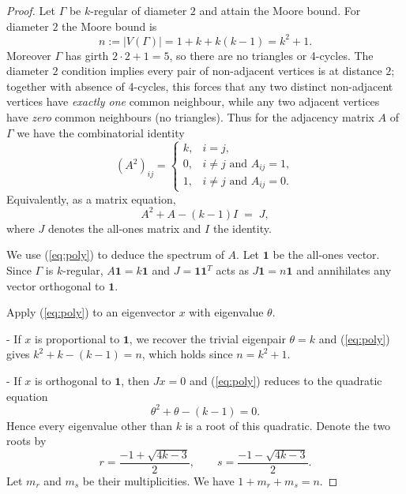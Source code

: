 \documentclass[12pt,a4paper,openany]{book}
\begin{document}
\begin{proof}
Let \(\Gamma\) be \(k\)-regular of diameter \(2\) and attain the Moore
bound. For diameter \(2\) the Moore bound is
\[
n := |V(\Gamma)| = 1 + k + k(k-1) = k^2 + 1.
\]
Moreover \(\Gamma\) has girth \(2\cdot 2 + 1 = 5\), so there are no
triangles or 4-cycles. The diameter \(2\) condition implies every pair
of non-adjacent vertices is at distance \(2\); together with absence of
4-cycles, this forces that any two distinct non-adjacent vertices have
\emph{exactly one} common neighbour, while any two adjacent vertices
have \emph{zero} common neighbours (no triangles). Thus for the adjacency
matrix \(A\) of \(\Gamma\) we have the combinatorial identity
\[
(A^2)_{ij} =
\begin{cases}
k, & i=j,\\[3pt]
0, & i\ne j \text{ and } A_{ij}=1,\\[3pt]
1, & i\ne j \text{ and } A_{ij}=0.
\end{cases}
\]
Equivalently, as a matrix equation,
\begin{equation}\label{eq:poly}
A^2 + A - (k-1)I \;=\; J,
\end{equation}
where \(J\) denotes the all-ones matrix and \(I\) the identity.

We use (\ref{eq:poly}) to deduce the spectrum of \(A\). Let \(\mathbf{1}\)
be the all-ones vector. Since \(\Gamma\) is \(k\)-regular,
\(A\mathbf{1}=k\mathbf{1}\) and \(J=\mathbf{1}\mathbf{1}^T\) acts as
\(J\mathbf{1}=n\mathbf{1}\) and annihilates any vector orthogonal to
\(\mathbf{1}\).

Apply (\ref{eq:poly}) to an eigenvector \(x\) with eigenvalue \(\theta\).

- If \(x\) is proportional to \(\mathbf{1}\), we recover the trivial
  eigenpair \(\theta=k\) and (\ref{eq:poly}) gives
  \(k^2 + k - (k-1) = n\), which holds since \(n=k^2+1\).

- If \(x\) is orthogonal to \(\mathbf{1}\), then \(Jx=0\) and
  (\ref{eq:poly}) reduces to the quadratic equation
  \[
  \theta^2 + \theta - (k-1) = 0.
  \]
  Hence every eigenvalue other than \(k\) is a root of this quadratic.
  Denote the two roots by
  \[
  r = \frac{-1 + \sqrt{4k-3}}{2},\qquad s = \frac{-1 - \sqrt{4k-3}}{2}.
  \]
  Let \(m_r\) and \(m_s\) be their multiplicities. We have \(1+m_r+m_s=n\).


\end{proof}
\end{document}
